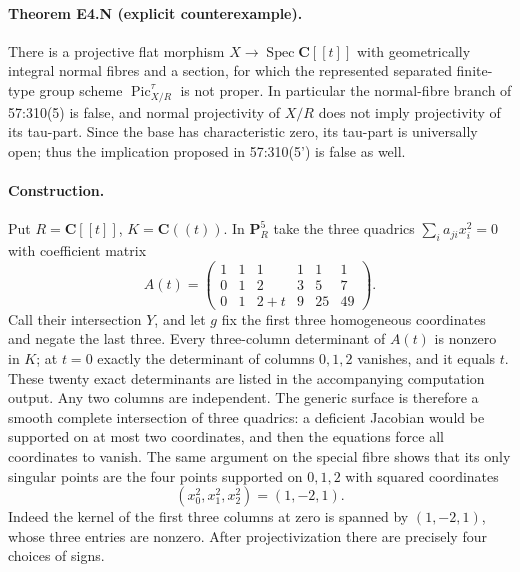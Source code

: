 \paragraph{Theorem E4.N (explicit counterexample).}
There is a projective flat morphism $X\to\operatorname{Spec}\mathbf C[[t]]$
with geometrically integral normal fibres and a section, for which the
represented separated finite-type group scheme $\operatorname{Pic}^\tau_{X/R}$
is not proper. In particular the normal-fibre branch of 57:310(5) is false,
and normal projectivity of $X/R$ does not imply projectivity of its tau-part.
Since the base has characteristic zero, its tau-part is universally open;
thus the implication proposed in 57:310(5') is false as well.

\paragraph{Construction.}
Put $R=\mathbf C[[t]]$, $K=\mathbf C((t))$. In $\mathbf P^5_R$ take the
three quadrics $\sum_i a_{ji}x_i^2=0$ with coefficient matrix
\[
 A(t)=\begin{pmatrix}
 1&1&1&1&1&1\\
 0&1&2&3&5&7\\
 0&1&2+t&9&25&49
 \end{pmatrix}.
\]
Call their intersection $Y$, and let $g$ fix the first three homogeneous
coordinates and negate the last three. Every three-column determinant of
$A(t)$ is nonzero in $K$; at $t=0$ exactly the determinant of columns
$0,1,2$ vanishes, and it equals $t$. These twenty exact determinants are
listed in the accompanying computation output. Any two columns are
independent. The generic surface is therefore a smooth complete intersection
of three quadrics: a deficient Jacobian would be supported on at most two
coordinates, and then the equations force all coordinates to vanish.
The same argument on the special fibre shows that its only singular points
are the four points supported on $0,1,2$ with squared coordinates
\[
 (x_0^2,x_1^2,x_2^2)=(1,-2,1).
\]
Indeed the kernel of the first three columns at zero is spanned by
$(1,-2,1)$, whose three entries are nonzero. After projectivization there
are precisely four choices of signs.


